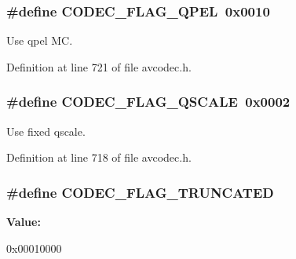 \subsubsection[{\texorpdfstring{C\+O\+D\+E\+C\+\_\+\+F\+L\+A\+G\+\_\+\+Q\+P\+EL}{CODEC_FLAG_QPEL}}]{\setlength{\rightskip}{0pt plus 5cm}\#define C\+O\+D\+E\+C\+\_\+\+F\+L\+A\+G\+\_\+\+Q\+P\+EL~0x0010}\hypertarget{group__lavc__core_ga98a9398894b844b3a18fe0cf2a64bbfb}{}\label{group__lavc__core_ga98a9398894b844b3a18fe0cf2a64bbfb}


Use qpel MC. 



Definition at line 721 of file avcodec.\+h.

\subsubsection[{\texorpdfstring{C\+O\+D\+E\+C\+\_\+\+F\+L\+A\+G\+\_\+\+Q\+S\+C\+A\+LE}{CODEC_FLAG_QSCALE}}]{\setlength{\rightskip}{0pt plus 5cm}\#define C\+O\+D\+E\+C\+\_\+\+F\+L\+A\+G\+\_\+\+Q\+S\+C\+A\+LE~0x0002}\hypertarget{group__lavc__core_gab743ec1092ea932e7964f7753d223bee}{}\label{group__lavc__core_gab743ec1092ea932e7964f7753d223bee}


Use fixed qscale. 



Definition at line 718 of file avcodec.\+h.

\subsubsection[{\texorpdfstring{C\+O\+D\+E\+C\+\_\+\+F\+L\+A\+G\+\_\+\+T\+R\+U\+N\+C\+A\+T\+ED}{CODEC_FLAG_TRUNCATED}}]{\setlength{\rightskip}{0pt plus 5cm}\#define C\+O\+D\+E\+C\+\_\+\+F\+L\+A\+G\+\_\+\+T\+R\+U\+N\+C\+A\+T\+ED}\hypertarget{group__lavc__core_ga3bbd99307dfa5f8a096d646bc9d03bca}{}\label{group__lavc__core_ga3bbd99307dfa5f8a096d646bc9d03bca}
{\bfseries Value\+:}
\begin{DoxyCode}
0x00010000 
\end{DoxyCode}


